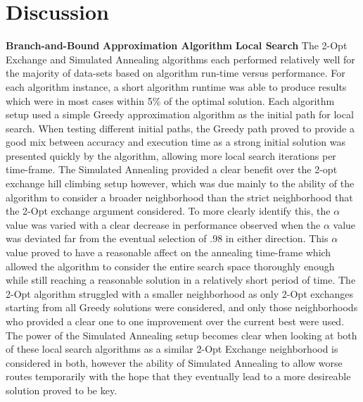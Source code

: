 \documentclass[format=sigconf]{acmart}
\begin{document}
\section{Discussion}
\textbf{Branch-and-Bound}\newline
\textbf{Approximation Algorithm}\newline
\textbf{Local Search} The 2-Opt Exchange and Simulated Annealing algorithms each performed relatively 
well for the majority of data-sets based on algorithm run-time versus performance. For each algorithm instance, a short
algorithm runtime was able to produce results which were in most cases within 5\% of the optimal solution. Each algorithm setup 
used a simple Greedy approximation algorithm as the initial path for local search. When testing different initial paths, the Greedy path 
proved to provide a good mix between accuracy and execution time as a strong initial solution was presented quickly by the algorithm, allowing more local 
search iterations per time-frame. The Simulated Annealing 
provided a clear benefit over the 2-opt exchange hill climbing setup however, which was due mainly to the ability of the algorithm to consider 
a broader neighborhood than the strict neighborhood that the 2-Opt exchange argument considered. To more clearly identify this, the $\alpha$ value was 
varied with a clear decrease in performance observed when the $\alpha$ value was deviated far from the eventual selection of .98 in either direction. 
This $\alpha$ value proved to have a reasonable affect on the annealing time-frame which allowed the algorithm to consider the entire search space thoroughly enough 
while still reaching a reasonable solution in a relatively short period of time. The 2-Opt algorithm struggled with a smaller neighborhood as only 2-Opt exchanges starting from 
all Greedy solutions were considered, and only those neighborhoods who provided a clear one to one improvement over the current best were used. The power of the Simulated Annealing setup 
becomes clear when looking at both of these local search algorithms as a similar 2-Opt Exchange neighborhood is considered in both, however the ability of Simulated Annealing to 
allow worse routes temporarily with the hope that they eventually lead to a more desireable solution proved to be key.
\end{document}
